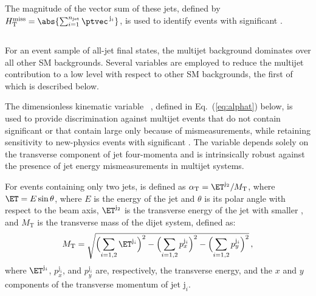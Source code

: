 \subsection{\texorpdfstring{\HTmiss}{HTmiss}}

The magnitude of the vector \ptvec sum of these jets, defined by
$\HTmiss = \abs{\sum_{{i}=1}^{\njet} \ptvec^{\,\mathrm{j}_i}}$, is
used to identify events with significant \ptvecmiss.

\subsection{\texorpdfstring{\alphat}{AlphaT}}
\label{sec:alphatdef}

For an event sample of all-jet final states, the multijet background
dominates over all other SM backgrounds. Several variables are
employed to reduce the multijet contribution to a low level with
respect to other SM backgrounds, the first of which is described
below.

The dimensionless kinematic variable \alphat~\cite{Randall:2008rw,
  CMS:2008vya, CMS-PAS-SUS-09-001}, defined in Eq.~(\ref{eq:alphat})
below, is used to provide discrimination against multijet events that
do not contain significant \ptvecmiss or that contain large \ptvecmiss
only because of \pt mismeasurements, while retaining sensitivity to
new-physics events with significant \ptvecmiss. The \alphat variable
depends solely on the transverse component of jet four-momenta and is
intrinsically robust against the presence of jet energy
mismeasurements in multijet systems. 

For events containing only two jets, \alphat is defined as $\alphat =
\ET^{\mathrm{j}_2}/M_\mathrm{T}$, where $\ET= E\sin\theta$, where $E$
is the energy of the jet and $\theta$ is its polar angle with respect
to the beam axis, $\ET^{\mathrm{j}_2}$ is the transverse energy of the
jet with smaller \ET, and $M_\mathrm{T}$ is the transverse mass of the
dijet system, defined as:
\begin{equation}
  \label{eq:mt}
  M_\mathrm{T} = \sqrt{ \Bigl( \sum_{i=1,2} \ET^{\mathrm{j}_i}
    \Bigr)^2 - \Bigl( \sum_{i=1,2} p_x^{\mathrm{j}_i} \Bigr)^2 - \Bigl(
      \sum_{i=1,2} p_y^{\mathrm{j}_i} \Bigr)^2}\, ,
\end{equation}
where $\ET^{\mathrm{j}_i}$, $p_x^{\mathrm{j}_i}$, and
$p_y^{\mathrm{j}_i}$ are, respectively, the transverse energy, and the
$x$ and $y$ components of the transverse momentum of jet
$\mathrm{j}_i$.

